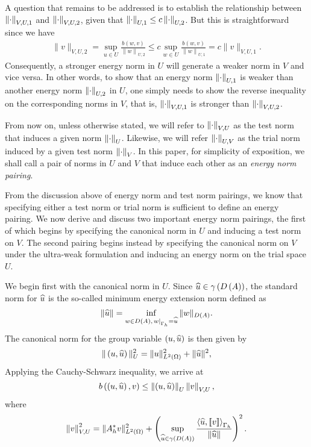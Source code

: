 A question that remains to be addressed is to establish the relationship
between $\nor{\cdot}_{V,U,1}$ and $\nor{\cdot}_{V,U,2}$, given that
$\nor{\cdot}_{U,1} \le c \nor{\cdot}_{U,2}$. But this is
straightforward since we have
\begin{align*}
 \| v \|_{V,U,2} = \sup_{u \in U} \frac{b\left(w,v\right)}{\left\|
  w \right\|_{U,2}} \le c\sup_{w \in U} \frac{b\left(w,v\right)}{\left\| w
  \right\|_{U,1}} = c\| v \|_{V,U,1}.
\end{align*}
Consequently, a stronger energy norm in $U$ will generate a weaker
norm in $V$ and vice versa. In other words, to show that an
energy norm $\nor{\cdot}_{U,1}$ is weaker than another energy norm
$\nor{\cdot}_{U,2}$ in $U$, one simply needs to show the reverse inequality on the
corresponding norms in $V$, that is, $\nor{\cdot}_{V,U,1}$ is stronger
than $\nor{\cdot}_{V,U,2}$.

From now on, unless otherwise stated, we will refer to $\nor{\cdot}_{V,U}$ as the test norm that induces a given norm $\nor{\cdot}_U$. Likewise, we will refer $\nor{\cdot}_{U,V}$ as the trial norm induced by a given test norm $\nor{\cdot}_V$. In this paper, for simplicity of exposition, we shall call a pair of norms in $U$ and $V$ that induce each other as an {\em energy norm pairing}.

From the discussion above of energy norm and test norm pairings, we know that specifying either a test norm or trial norm is sufficient to define an energy pairing. We now derive and discuss two important energy norm pairings, the first of which begins by specifying the canonical norm in $U$ and inducing a test norm on $V$. The second pairing begins instead by specifying the canonical norm on $V$ under the ultra-weak formulation  and inducing an energy norm on the trial space $U$.

We begin first with the canonical norm in $U$. Since $\uh \in \gamma\LRp{D\LRp{A}}$, the standard norm for $\uh$ is
the so-called minimum energy extension norm defined as
\begin{equation}
\eqnlab{MEnorm}
\|\widehat{u}\| = \inf_{w\in D\LRp{A},
  \left.w\right|_{\Gh}=\widehat{u}} \|w\|_{D\LRp{A}}.
\end{equation}
The canonical norm for the group variable $\LRp{u,\uh}$ is then given by
\[
\|\left(u,\widehat{u}\right)\|_U^2 = \|u\|^2_{\L} + \|\widehat{u}\|^2,
\]
Applying the Cauchy-Schwarz inequality, we arrive at
\[
b\LRp{\LRp{u,\uh},v} \le \nor{\LRp{u,\uh}}_U \nor{v}_{V,U},
\]
where
\[
\nor{v}_{V,U}^2 = \|A_h^*v\|_{\L}^2
+\left(\sup_{\widehat{u} \in \gamma\LRp{D\LRp{A}}} \frac{\LRa{ \widehat{u},
  \jump{v} }_{\Gh}}{\|\widehat{u}\|}\right)^2.
\]

